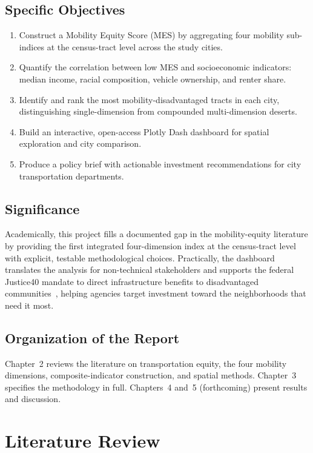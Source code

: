 \documentclass[11pt]{article}
\begin{document}
\subsection{Specific Objectives}
\begin{enumerate}[leftmargin=1.4em,itemsep=1pt]
\item Construct a Mobility Equity Score (MES) by aggregating four mobility
sub-indices at the census-tract level across the study cities.
\item Quantify the correlation between low MES and socioeconomic indicators:
median income, racial composition, vehicle ownership, and renter share.
\item Identify and rank the most mobility-disadvantaged tracts in each city,
distinguishing single-dimension from compounded multi-dimension deserts.
\item Build an interactive, open-access Plotly Dash dashboard for spatial
exploration and city comparison.
\item Produce a policy brief with actionable investment recommendations for city
transportation departments.
\end{enumerate}

\subsection{Significance}
Academically, this project fills a documented gap in the mobility-equity
literature by providing the first integrated four-dimension index at the
census-tract level with explicit, testable methodological choices. Practically,
the dashboard translates the analysis for non-technical stakeholders and supports
the federal Justice40 mandate to direct infrastructure benefits to disadvantaged
communities~\cite{argonne2022}, helping agencies target investment toward the
neighborhoods that need it most.

\subsection{Organization of the Report}
Chapter~2 reviews the literature on transportation equity, the four mobility
dimensions, composite-indicator construction, and spatial methods. Chapter~3
specifies the methodology in full. Chapters~4 and~5 (forthcoming) present results
and discussion.

\section{Literature Review}
\end{document}
